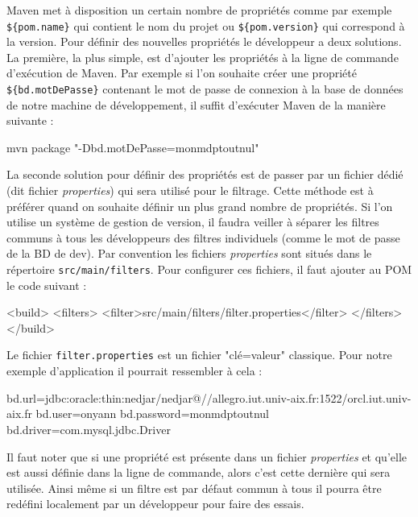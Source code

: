 \documentclass[a4paper,11pt]{article}
\begin{document}
Maven met à disposition un certain nombre de propriétés comme par exemple \texttt{\$\{pom.name\}} qui contient le nom 
du projet ou \texttt{\$\{pom.version\}} qui correspond à la version. Pour définir des nouvelles propriétés le développeur
a deux solutions. La première, la plus simple, est d'ajouter les propriétés à la ligne de commande d'exécution de Maven.
Par exemple si l'on souhaite créer une propriété \texttt{\$\{bd.motDePasse\}} contenant le mot de passe de connexion à 
la base de données de notre machine de développement, il suffit d'exécuter Maven de la manière suivante :
\begin{code_shell}
mvn package "-Dbd.motDePasse=monmdptoutnul"
\end{code_shell}
La seconde solution pour définir des propriétés est de passer par un fichier dédié (dit fichier \emph{properties}) qui 
sera utilisé pour le filtrage. Cette méthode est à préférer quand on souhaite définir un plus grand nombre de propriétés.
Si l'on utilise un système de gestion de version, il faudra veiller à séparer les filtres communs à tous les développeurs 
des filtres individuels (comme le mot de passe de la BD de dev). Par convention les fichiers \emph{properties} sont situés dans le répertoire 
\texttt{src/main/filters}. Pour configurer ces fichiers, il faut ajouter au POM le code suivant : 
\begin{code_xml}
<build>
  <filters>
    <filter>src/main/filters/filter.properties</filter>
  </filters>
</build>
\end{code_xml}
Le fichier \texttt{filter.properties} est un fichier "clé=valeur" classique. Pour notre exemple d'application il 
pourrait ressembler à cela : 
\begin{code_xml}
bd.url=jdbc:oracle:thin:nedjar/nedjar@//allegro.iut.univ-aix.fr:1522/orcl.iut.univ-aix.fr
bd.user=onyann
bd.password=monmdptoutnul
bd.driver=com.mysql.jdbc.Driver
\end{code_xml}
Il faut noter que si une propriété est présente dans un fichier \emph{properties} et 
qu'elle est aussi définie dans la ligne de commande, alors c'est cette dernière qui sera utilisée. Ainsi même si un filtre
est par défaut commun à tous il pourra être redéfini localement par un développeur pour faire des essais.
\end{document}
